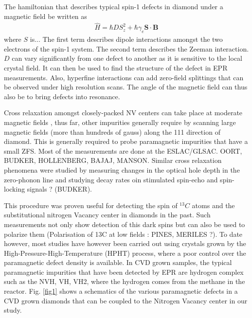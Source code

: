 \documentclass[9pt,twocolumn,twoside]{osajnl}
\newcommand{\bea}{\begin{eqnarray}}
\newcommand{\eea}{\end{eqnarray}}
\begin{document}
The hamiltonian that describes typical spin-1 defects in diamond under a magnetic field be written as 
\bea
\hat{H}=\hbar D S_z^2+\hbar \gamma_e\bm S \cdot \bm B
\eea
where $S$ is...
The first term describes dipole interactions amongst the two electrons of the spin-1 system. The second term describes the Zeeman interaction.
$D$ can vary significantly from one defect to another as it is sensitive to the local crystal field. It can then be used to find the structure of the defect in EPR measurements.
Also, hyperfine interactions can add zero-field splittings that can be observed under high resolution scans. 
The angle of the magnetic field can thus also be to bring defects into resonance. 

Cross relaxation amongst closely-packed NV centers can take place at moderate magnetic fields \cite{van_oort_optically_1991, van_oort_cross-relaxation_1989, armstrong_nvnv_2010, jarmola_longitudinal_2015, akhmedzhanov_microwave-free_2017, akhmedzhanov_magnetometry_2019, holliday_optical_1989, choi_depolarization_2017}, thus far, other impurities generally require by scanning large magnetic fields (more than hundreds of gauss) along the 111 direction of diamond. 
This is generally required to probe paramagnetic impurities that have a small ZFS. 
Most of the measurements are done at the ESLAC/GLSAC. OORT, BUDKER, HOLLENBERG, BAJAJ, MANSON.
Similar cross relaxation phenomena were studied by measuring changes in the optical hole depth in the zero-phonon line and studying decay rates oin stimulated spin-echo and spin-locking signals ? (BUDKER).

This procedure was proven useful for detecting the spin of $^{13}C$ atoms and the substitutional nitrogen Vacancy center in diamonds in the past. Such measurements not only show detection of this dark spins but can also be used to polarize them (Polarisation of 13C at low fields : PINES, MERILES ?). 
To date however, most studies have however been carried out using crystals grown by the High-Pressure-High-Temperature (HPHT) process, where a poor control over the paramagnetic defect density is available. In CVD grown samples, the typical paramagnetic impurities that have been detected by EPR are hydrogen complex such as the NVH, VH, VH2, where the hydrogen comes from the methane in the reactor. Fig.  \ref{fig1} shows a schematics of the various paramagnetic defects in a CVD grown diamonds that can be coupled to the Nitrogen Vacancy center in our study.
\end{document}
